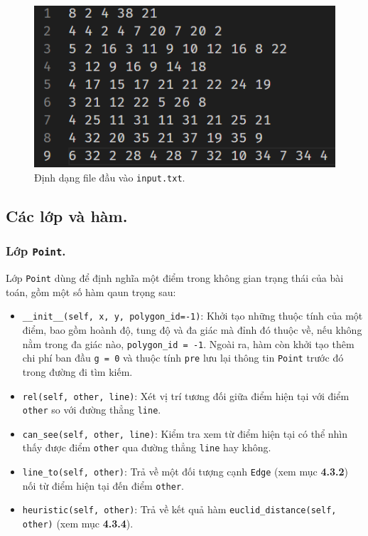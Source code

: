 \documentclass[a4paper, 11pt]{article}
\begin{document}
\begin{figure}[h]
  \centering
  \includegraphics[width=.75\textwidth,height=.75\textheight,keepaspectratio]{input.png}
  \caption{Định dạng file đầu vào \lstinline|input.txt|.}
\end{figure}

\subsection{Các lớp và hàm.}
\subsubsection{Lớp \lstinline|Point|.}
Lớp \lstinline|Point| dùng để định nghĩa một điểm trong không gian trạng thái của bài toán, gồm một số hàm qaun trọng sau:

\begin{itemize}
  \item \lstinline|__init__(self, x, y, polygon_id=-1)|: Khởi tạo những thuộc tính của một điểm, bao gồm hoành độ, tung độ và đa giác mà đỉnh đó thuộc về, nếu không nằm trong đa giác nào, \lstinline|polygon_id = -1|. Ngoài ra, hàm còn khởi tạo thêm chi phí ban đầu \lstinline|g = 0| và thuộc tính \lstinline|pre| lưu lại thông tin \lstinline|Point| trước đó trong đường đi tìm kiếm.
  \item \lstinline|rel(self, other, line)|: Xét vị trí tương đối giữa điểm hiện tại với điểm \lstinline|other| so với đường thẳng \lstinline|line|.
  \item \lstinline|can_see(self, other, line)|: Kiểm tra xem từ điểm hiện tại có thể nhìn thấy được điểm \lstinline|other| qua đường thẳng \lstinline|line| hay không.
  \item \lstinline|line_to(self, other)|: Trả về một đối tượng cạnh \lstinline|Edge| (xem mục \textbf{4.3.2}) nối từ điểm hiện tại đến điểm \lstinline|other|.
  \item \lstinline|heuristic(self, other)|: Trả về kết quả hàm \lstinline|euclid_distance(self, other)| (xem mục \textbf{4.3.4}).
\end{itemize}
\end{document}
